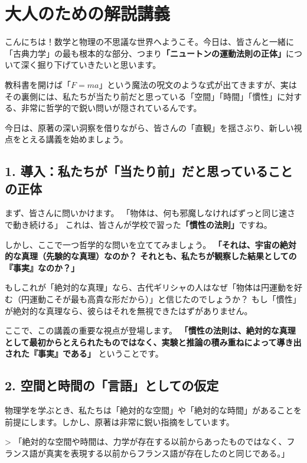 \documentclass[a4paper,11pt,openany]{ltjsbook}
\begin{document}
\section{大人のための解説講義}
\begin{lecturebox}
こんにちは！数学と物理の不思議な世界へようこそ。今日は、皆さんと一緒に「古典力学」の最も根本的な部分、つまり\textbf{「ニュートンの運動法則の正体」}について深く掘り下げていきたいと思います。

教科書を開けば「$F=ma$」という魔法の呪文のような式が出てきますが、実はその裏側には、私たちが当たり前だと思っている「空間」「時間」「慣性」に対する、非常に哲学的で鋭い問いが隠されているんです。

今日は、原著の深い洞察を借りながら、皆さんの「直観」を揺さぶり、新しい視点をとえる講義を始めましょう。

\subsection*{1. 導入：私たちが「当たり前」だと思っていることの正体}

まず、皆さんに問いかけます。
「物体は、何も邪魔しなければずっと同じ速さで動き続ける」
これは、皆さんが学校で習った\textbf{「慣性の法則」}ですね。

しかし、ここで一つ哲学的な問いを立ててみましょう。
\textbf{「それは、宇宙の絶対的な真理（先験的な真理）なのか？ それとも、私たちが観察した結果としての『事実』なのか？」}

もしこれが「絶対的な真理」なら、古代ギリシャの人はなぜ「物体は円運動を好む（円運動こそが最も高貴な形だから）」と信じたのでしょうか？ もし「慣性」が絶対的な真理なら、彼らはそれを無視できたはずがありません。

ここで、この講義の重要な視点が登場します。
\textbf{「慣性の法則は、絶対的な真理として最初からとえられたものではなく、実験と推論の積み重ねによって導き出された『事実』である」} ということです。

\subsection*{2. 空間と時間の「言語」としての仮定}

物理学を学ぶとき、私たちは「絶対的な空間」や「絶対的な時間」があることを前提にします。しかし、原著は非常に鋭い指摘をしています。

> 「絶対的な空間や時間は、力学が存在する以前からあったものではなく、フランス語が真実を表現する以前からフランス語が存在したのと同じである。」


\end{lecturebox}
\end{document}
